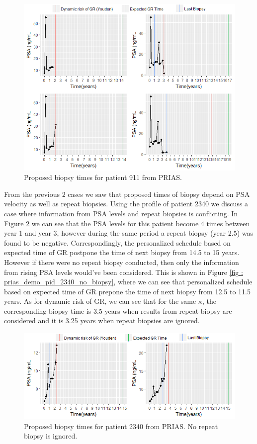 \begin{figure}
\centerline{
\includegraphics[width=\columnwidth]{images/prias_demo/case_911.png}
}
\caption{Proposed biopsy times for patient 911 from PRIAS.}
\label{fig : prias_demo_pid_911}
\end{figure}

From the previous 2 cases we saw that proposed times of biopsy depend on PSA velocity as well as repeat biopsies. Using the profile of patient 2340 we discuss a case where information from PSA levels and repeat biopsies is conflicting. In Figure \ref{fig : prias_demo_pid_2340_yes_biopsy} we can see that the PSA levels for this patient become 4 times between year 1 and year 3, however during the same period a repeat biopsy (year 2.5) was found to be negative. Correspondingly, the personalized schedule based on expected time of GR postpone the time of next biopsy from 14.5 to 15 years. However if there were no repeat biopsy conducted, then only the information from rising PSA levels would've been considered. This is shown in Figure \ref{fig : prias_demo_pid_2340_no_biopsy}, where we can see that personalized schedule based on expected time of GR prepone the time of next biopsy from 12.5 to 11.5 years. As for dynamic risk of GR, we can see that for the same $\kappa$, the corresponding biopsy time is 3.5 years when results from repeat biopsy are considered and it is 3.25 years when repeat biopsies are ignored.

\begin{figure}
\centerline{\includegraphics[width=\columnwidth]{images/prias_demo/case_2340_yesbiopsy.png}}
\caption{Proposed biopsy times for patient 2340 from PRIAS. No repeat biopsy is ignored.}
\label{fig : prias_demo_pid_2340_yes_biopsy}
\end{figure}

